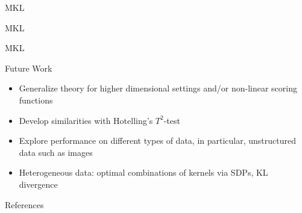 \documentclass{beamer}
\begin{document}
\begin{frame}{MKL}
  \begin{center}
    \resizebox{10.0cm}{!}{
      
    }
  \end{center}
\end{frame}

\begin{frame}{MKL}
  \begin{center}
    \resizebox{10.0cm}{!}{
      
    }
  \end{center}
\end{frame}

\begin{frame}{MKL}
  \begin{center}
    \resizebox{10.0cm}{!}{
      
    }
  \end{center}
\end{frame}

\begin{frame}{Future Work}
  \begin{itemize}
  \item Generalize theory for higher dimensional settings and/or
    non-linear scoring functions \pause
  \item Develop similarities with Hotelling's $T^2$-test \pause
  \item Explore performance on different types of data, in particular,
    unstructured data such as images \pause
  \item Heterogeneous data: optimal combinations of kernels
    via SDPs, KL divergence \pause
  \end{itemize}
\end{frame}

\begin{frame}[allowframebreaks]{References}
  
  
\end{frame}
\end{document}
